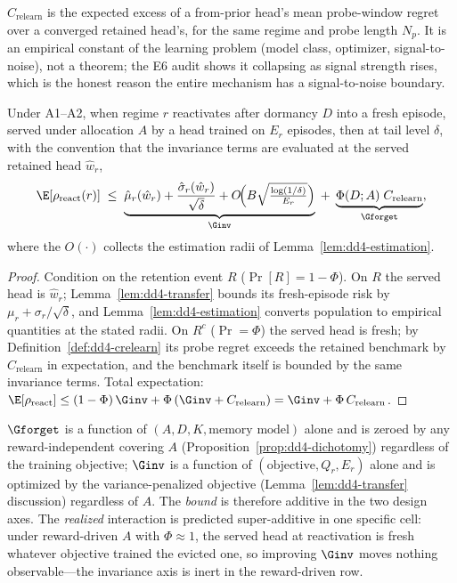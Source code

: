 \begin{definition}
\label{def:dd4-crelearn}
$C_{\mathrm{relearn}}$ is the expected excess of a from-prior head's
mean probe-window regret over a converged retained head's, for the same
regime and probe length $N_p$. It is an empirical constant of the
learning problem (model class, optimizer, signal-to-noise), not a
theorem; the E6 audit shows it collapsing as signal strength rises,
which is the honest reason the entire mechanism has a signal-to-noise
boundary.
\end{definition}

\begin{proposition}
\label{prop:dd4-decomp}
Under A1--A2, when regime $r$ reactivates after dormancy $D$ into a
fresh episode, served under allocation $A$ by a head trained on $E_r$
episodes, then at tail level $\delta$, with the convention that the
invariance terms are evaluated at the served retained head $\hat w_r$,
\[
  \E[\rho_{\mathrm{react}}(r)] \;\le\;
  \underbrace{\hat\mu_r(\hat w_r) + \frac{\hat\sigma_r(\hat w_r)}{\sqrt\delta}
  + O\!\Big(B\sqrt{\tfrac{\log(1/\delta)}{E_r}}\Big)}_{\Ginv}
  \;+\;
  \underbrace{\Phi(D; A)\; C_{\mathrm{relearn}}}_{\Gforget},
\]
where the $O(\cdot)$ collects the estimation radii of
Lemma~\ref{lem:dd4-estimation}.
\end{proposition}

\begin{proof}
Condition on the retention event $R$ ($\Pr[R] = 1 - \Phi$). On $R$ the
served head is $\hat w_r$; Lemma~\ref{lem:dd4-transfer} bounds its
fresh-episode risk by $\mu_r + \sigma_r/\sqrt\delta$, and
Lemma~\ref{lem:dd4-estimation} converts population to empirical
quantities at the stated radii. On $R^c$ ($\Pr = \Phi$) the served head
is fresh; by Definition~\ref{def:dd4-crelearn} its probe regret exceeds
the retained benchmark by $C_{\mathrm{relearn}}$ in expectation, and the
benchmark itself is bounded by the same invariance terms. Total
expectation: $\E[\rho_{\mathrm{react}}] \le (1-\Phi)\,\Ginv + \Phi\,
(\Ginv + C_{\mathrm{relearn}}) = \Ginv + \Phi\, C_{\mathrm{relearn}}$.
\end{proof}

\begin{proposition}
\label{prop:dd4-additive}
$\Gforget$ is a function of $(A, D, K, \text{memory model})$ alone and
is zeroed by any reward-independent covering $A$
(Proposition~\ref{prop:dd4-dichotomy}) regardless of the training
objective; $\Ginv$ is a function of $(\text{objective}, Q_r, E_r)$ alone
and is optimized by the variance-penalized objective
(Lemma~\ref{lem:dd4-transfer} discussion) regardless of $A$. The
\emph{bound} is therefore additive in the two design axes. The
\emph{realized} interaction is predicted super-additive in one specific
cell: under reward-driven $A$ with $\Phi \approx 1$, the served head at
reactivation is fresh whatever objective trained the evicted one, so
improving $\Ginv$ moves nothing observable---the invariance axis is
inert in the reward-driven row.
\end{proposition}

